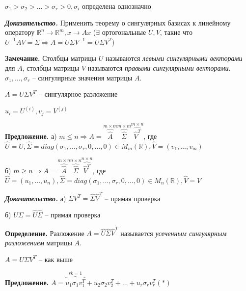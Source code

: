 $\sigma_1 > \sigma_2 > \dots > \sigma_r > 0, \sigma_i$ определена однозначно

\vspace{\baselineskip}
\textbf{\textit{Доказательство.}} Применить теорему о сингулярных базисах к линейному оператору $\mathbb{R}^n \rightarrow \mathbb{R}^m, x \rightarrow Ax$ ($\exists$ ортогональные $U, V$, такие что $U^{-1} A V = \Sigma \Rightarrow A = U \Sigma V^{-1} = U \Sigma V^T$)

\vspace{\baselineskip}
\textbf{Замечание.} Столбцы матрицы $U$ называются \textit{левыми сингулярными векторами} для $A$, столбцы матрицы $V$ называются \textit{правыми сингулярными векторами}. $\sigma_1, \dots, \sigma_r$ -- сингулярные значения матрицы $A$.

\vspace{\baselineskip}
$A = U \Sigma V^T$ -- сингулярное разложение

$u_i = U^{(i)}, v_j = V^{(j)}$

\vspace{\baselineskip}
\textbf{Предложение.} а) $m \leqslant n \Rightarrow A = \overbrace{\hat{A}}^{m \times m} \overbrace{\hat{\Sigma}}^{m \times m} \overbrace{\hat{V}^T}^{m \times n}$, где $\hat{U} = U, \hat{\Sigma} = diag(\sigma_1, \dots, \sigma_r, 0, \dots, 0) \in M_m(\mathbb{R}), \hat{V} = (v_1, \dots, v_m)$

б) $m \geqslant n \Rightarrow A = \overbrace{\hat{A}}^{m \times n} \overbrace{\hat{\Sigma}}^{n \times n} \overbrace{\hat{V}^T}^{n \times n}$, где $\hat{U} = (u_1, \dots, u_n), \hat{\Sigma} = diag(\sigma_1, \dots, \sigma_r, 0, \dots, 0) \in M_n(\mathbb{R}), \hat{V} = V$

\vspace{\baselineskip}
\textbf{\textit{Доказательство.}} а) $\Sigma V^T = \hat{\Sigma} \hat{V}^T$ -- прямая проверка

б) $U \Sigma = \hat{U }\hat{\Sigma}$ -- прямая проверка

\vspace{\baselineskip}
\textbf{Определение.} Разложение $A = \hat{U} \hat{\Sigma} \hat{V}^T$ называется \textit{усеченным сингулярным разложением} матрицы $A$.

\vspace{\baselineskip}
$A = U \Sigma V^T$ -- как выше

\vspace{\baselineskip}
\textbf{Предложение.} $A = \overbrace{u_1 \sigma_1 v_1^T}^{rk = 1} + u_2 \sigma_2 v_2^T + \dots + u_r \sigma_r v_r^T (*)$


